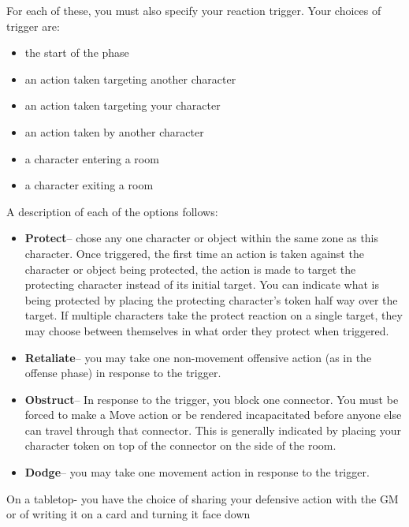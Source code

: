 For each of these, you must also specify your reaction trigger. Your choices of trigger are:

\begin{itemize}
	\item the start of the phase
	\item an action taken targeting another character
	\item an action taken targeting your character
	\item an action taken by another character
	\item a character entering a room
	\item a character exiting a room
\end{itemize}

A description of each of the options follows:

\begin{GRPquicknotewide}
\begin{itemize}
	\item \textbf{Protect}-- chose any one character or object within the same zone as this character. Once triggered, the first time an action is taken against the character or object being protected, the action is made to target the protecting character instead of its initial target. You can indicate what is being protected by placing the protecting character's token half way over the target. If multiple characters take the protect reaction on a single target, they may choose between themselves in what order they protect when triggered.
	\item \textbf{Retaliate}-- you may take one non-movement offensive action (as in the offense phase) in response to the trigger.
	\item \textbf{Obstruct}-- In response to the trigger, you block one connector. You must be forced to make a Move action or be rendered incapacitated before anyone else can travel through that connector. This is generally indicated by placing your character token on top of the connector on the side of the room.
	\item \textbf{Dodge}-- you may take one movement action in response to the trigger.
\end{itemize}
\end{GRPquicknotewide}

On a tabletop- you have the choice of sharing your defensive action with the GM or of writing it on a card and turning it face down


